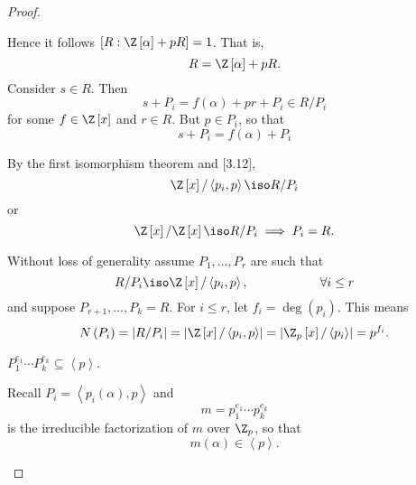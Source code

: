 \documentclass[pmath441]{subfiles}
\begin{document}
\begin{proof}
\begin{claim}
            Hence it follows $\left[ R:\Z\left[ \alpha \right]+pR \right] = 1$. That is,
            \begin{equation*}
                R = \Z\left[ \alpha \right]+pR.
            \end{equation*}
            Consider $s\in R$. Then
            \begin{equation*}
                s+P_i = f\left( \alpha \right) + pr + P_i\in R /P_i
            \end{equation*}
            for some $f\in\Z\left[ x \right]$ and $r\in R$. But $p\in P_i$, so that
            \begin{equation*}
                s+P_i = f\left( \alpha \right) + P_i
            \end{equation*}
        \end{claim}

        By the first isomorphism theorem and [3.12],
        \begin{equation*}
            \Z\left[ x \right] /\left< p_i,p \right> \iso R /P_i 
        \end{equation*}
        or
        \begin{equation*}
            \Z\left[ x \right] /\Z\left[ x \right] \iso R /P_i \implies P_i = R.
        \end{equation*}

        Without loss of generality assume $P_1,\ldots,P_r$ are such that
        \begin{equation*}
            R /P_i\iso \Z\left[ x \right] / \left< p_i,p \right>, \hspace{2cm}\forall i\leq r 
        \end{equation*}
        and suppose $P_{r+1},\ldots,P_k=R$. For $i\leq r$, let $f_i = \deg\left( p_i \right)$. This means
        \begin{equation*}
            N\left( P_i \right) = \left| R /P_i \right| = \left| \Z\left[ x \right] /\left< p_i,p \right>  \right| = \left| \Z_p\left[ x \right] /\left< p_i \right>  \right| = p^{f_i}.
        \end{equation*}

        \begin{claim}
            $P_1^{e_1}\cdots P_k^{e_k}\subseteq\left< p \right>$. 

            Recall $P_i = \left< p_i\left( \alpha \right),p \right>$ and
            \begin{equation*}
                m = p_1^{e_1}\cdots p_k^{e_k}
            \end{equation*}
            is the irreducible factorization of $m$ over $\Z_p$, so that
            \begin{equation*}
                m\left( \alpha \right) \in \left< p \right>. 
            \end{equation*}
        \end{claim}


\end{proof}
\end{document}
